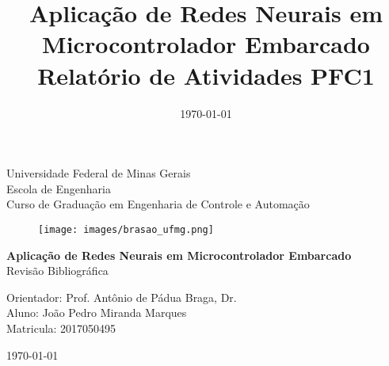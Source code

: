 \begin{titlepage}
    \begin{center}
           
    {\large Universidade Federal de Minas Gerais\\
    Escola de Engenharia \\
    Curso de Graduação em Engenharia de Controle e Automação\\}
    \vfill

    \begin{figure}[h]
        \centering
        \texttt{[image: images/brasao\_ufmg.png]}
    \end{figure}
    \vspace{2cm}


    {\bf\Large Aplicação de Redes Neurais em Microcontrolador Embarcado\\}
    \vspace{1cm} 
    {\Large Revisão Bibliográfica}
    \vspace{2cm}  
    
    {\large Orientador: Prof. Antônio de Pádua Braga, Dr.}\\

    
    {\large Aluno: João Pedro Miranda Marques \\
    Matricula: 2017050495}
    \vspace{2cm}  

    \today
    \vspace{2cm}  
       

    \large \date{\today}
    \end{center}
    
    \end{titlepage}
    
    \newpage
    \clearpage
    \thispagestyle{empty}
    
    \cleardoublepage


\title{
    Aplicação de Redes Neurais em Microcontrolador Embarcado \\
    \large Relatório de Atividades PFC1}

